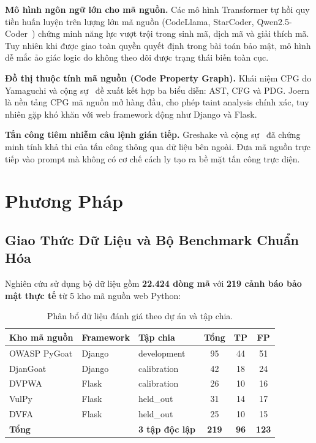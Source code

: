 \documentclass[12pt, a4paper]{article}
\begin{document}
\textbf{Mô hình ngôn ngữ lớn cho mã nguồn.}
Các mô hình Transformer tự hồi quy tiền huấn luyện trên lượng lớn mã
nguồn (CodeLlama, StarCoder, Qwen2.5-Coder~\cite{qwen25coder}) chứng minh
năng lực vượt trội trong sinh mã, dịch mã và giải thích mã. Tuy nhiên
khi được giao toàn quyền quyết định trong bài toán bảo mật, mô hình dễ
mắc ảo giác logic do không theo dõi được trạng thái biến toàn cục.

\textbf{Đồ thị thuộc tính mã nguồn (Code Property Graph).}
Khái niệm CPG do Yamaguchi và cộng sự~\cite{cpg2014} đề xuất kết hợp
ba biểu diễn: AST, CFG và PDG. Joern~\cite{joern} là nền tảng CPG mã
nguồn mở hàng đầu, cho phép taint analysis chính xác, tuy nhiên gặp
khó khăn với web framework động như Django và Flask.

\textbf{Tấn công tiêm nhiễm câu lệnh gián tiếp.}
Greshake và cộng sự~\cite{greshake2023} đã chứng minh tính khả thi của
tấn công thông qua dữ liệu bên ngoài. Đưa mã nguồn trực tiếp vào prompt
mà không có cơ chế cách ly tạo ra bề mặt tấn công trực diện.

\section{Phương Pháp}

\subsection{Giao Thức Dữ Liệu và Bộ Benchmark Chuẩn Hóa}

Nghiên cứu sử dụng bộ dữ liệu gồm \textbf{22.424 dòng mã} với
\textbf{219 cảnh báo bảo mật thực tế} từ 5 kho mã nguồn web Python:

\begin{table}[H]
  \centering
  \caption{Phân bổ dữ liệu đánh giá theo dự án và tập chia.}
  \label{tab:dataset}
  \begin{tabular}{lllccc}
    \toprule
    \textbf{Kho mã nguồn} & \textbf{Framework} & \textbf{Tập chia} &
    \textbf{Tổng} & \textbf{TP} & \textbf{FP} \\
    \midrule
    OWASP PyGoat   & Django & development   & 95  & 44 & 51 \\
    DjanGoat       & Django & calibration   & 42  & 18 & 24 \\
    DVPWA          & Flask  & calibration   & 26  & 10 & 16 \\
    VulPy          & Flask  & held\_out     & 31  & 14 & 17 \\
    DVFA           & Flask  & held\_out     & 25  & 10 & 15 \\
    \midrule
    \textbf{Tổng} & & \textbf{3 tập độc lập} &
    \textbf{219} & \textbf{96} & \textbf{123} \\
    \bottomrule
  \end{tabular}
\end{table}
\end{document}
